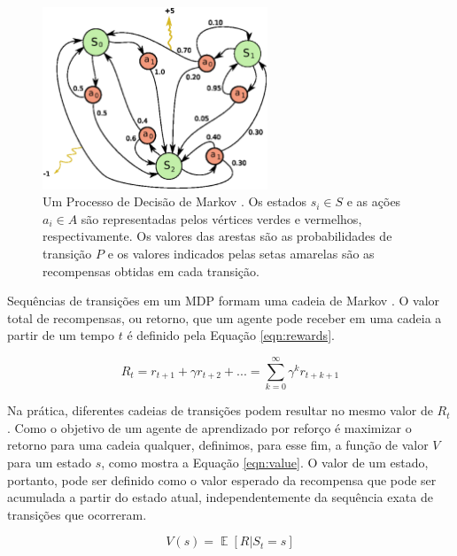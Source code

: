 \begin{figure}[ht]
 \centering
  \includegraphics[width=0.6\textwidth]{./fig/mdp}
  \captionsetup{width=1\textwidth}
  \caption[Um Processo de Decisão de Markov \cite{mohammad}.]{Um Processo de Decisão de Markov \cite{mohammad}. Os estados $s_i \in S$ e as ações $a_i \in A$ são representadas pelos vértices verdes e vermelhos, respectivamente. Os valores das arestas são as probabilidades de transição $P$ e os valores indicados pelas setas amarelas são as recompensas obtidas em cada transição.}
 \label{fig:mdp}
\end{figure}

Sequências de transições em um MDP formam uma cadeia de Markov \cite{drlhandson}. O valor total de recompensas, ou retorno, que um agente pode receber em uma cadeia a partir de um tempo $t$ é definido pela Equação \ref{eqn:rewards}.

\begin{equation}
\label{eqn:rewards}
R_t = r_{t+1} + \gamma r_{t+2} + ... = \sum^\infty_{k=0}{\gamma^k r_{t+k+1}}
\end{equation}

Na prática, diferentes cadeias de transições podem resultar no mesmo valor de $R_t$. Como o objetivo de um agente de aprendizado por reforço é maximizar o retorno para uma cadeia qualquer, definimos, para esse fim, a função de valor $V$ para um estado $s$, como mostra a Equação \ref{eqn:value}. O valor de um estado, portanto, pode ser definido como o valor esperado da recompensa que pode ser acumulada a partir do estado atual, independentemente da sequência exata de transições que ocorreram.

\begin{equation}
\label{eqn:value}
V(s) = \mathop{{}\mathbb{E}} [R | S_t=s]
\end{equation}

